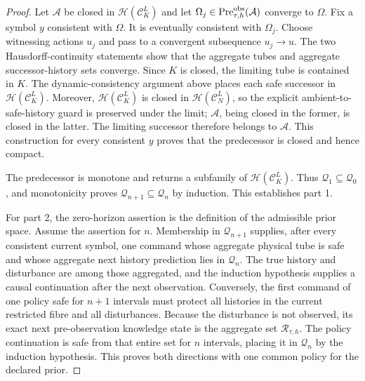 \documentclass[11pt]{article}
\theoremstyle{definition}
\newcommand{\Pre}{\operatorname{Pre}}
\begin{document}
\begin{proof}
Let $\mathcal A$ be closed in
$\mathcal H(\mathscr C_K^L)$ and let
$\Omega_j\in\Pre_{\tau,h}^{\rm obs}(\mathcal A)$ converge to $\Omega$.
Fix a symbol $y$ consistent with $\Omega$.  It is eventually consistent with
$\Omega_j$.  Choose witnessing actions $u_j$ and pass to a convergent
subsequence $u_j\to u$.  The two Hausdorff-continuity statements show that
the aggregate tubes and aggregate successor-history sets converge.  Since
$K$ is closed, the limiting tube is contained in $K$.  The dynamic-consistency
argument above places each safe successor in
$\mathcal H(\mathscr C_K^L)$.  Moreover,
$\mathcal H(\mathscr C_K^L)$ is closed in
$\mathcal H(\mathscr C_N^L)$, so the explicit ambient-to-safe-history guard
is preserved under the limit; $\mathcal A$, being closed in the former, is
closed in the latter.  The limiting successor therefore belongs to
$\mathcal A$.  This construction
for every consistent $y$ proves that the predecessor is closed and hence
compact.

The predecessor is monotone and returns a subfamily of
$\mathcal H(\mathscr C_K^L)$.  Thus $\mathcal Q_1\subseteq\mathcal Q_0$, and
monotonicity proves $\mathcal Q_{n+1}\subseteq\mathcal Q_n$ by induction.
This establishes part 1.

For part 2, the zero-horizon assertion is the definition of the admissible
prior space.  Assume the assertion for $n$.  Membership in
$\mathcal Q_{n+1}$ supplies, after every consistent current symbol, one
command whose aggregate physical tube is safe and whose aggregate next
history prediction lies in $\mathcal Q_n$.  The true history and disturbance
are among those aggregated, and the induction hypothesis supplies a causal
continuation after the next observation.  Conversely, the first command of
one policy safe for $n+1$ intervals must protect all histories in the
current restricted fibre and all disturbances.  Because the disturbance is
not observed, its exact next pre-observation knowledge state is the
aggregate set $\mathscr R_{\tau,h}$.  The policy continuation is safe from
that entire set for $n$ intervals, placing it in $\mathcal Q_n$ by the
induction hypothesis.  This proves both directions with one common policy
for the declared prior.


\end{proof}
\end{document}
